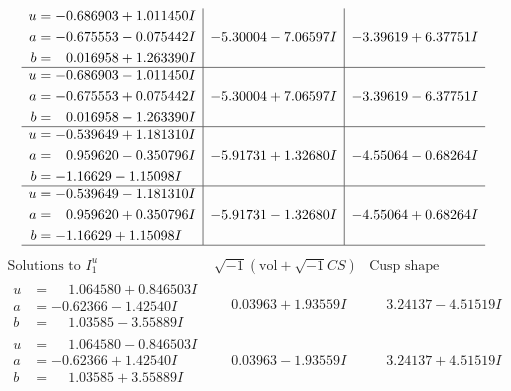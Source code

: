 \documentclass[1p]{elsarticle_modified}
\theoremstyle{definition}
\newcommand{\I}{\sqrt{-1}}
\begin{document}
$$\begin{array}{c|c|c}
\begin{aligned}
u &= -0.686903 + 1.011450 I \\
a &= -0.675553 - 0.075442 I \\
b &= \phantom{-}0.016958 + 1.263390 I\end{aligned}
 & -5.30004 - 7.06597 I & -3.39619 + 6.37751 I \\ \hline\begin{aligned}
u &= -0.686903 - 1.011450 I \\
a &= -0.675553 + 0.075442 I \\
b &= \phantom{-}0.016958 - 1.263390 I\end{aligned}
 & -5.30004 + 7.06597 I & -3.39619 - 6.37751 I \\ \hline\begin{aligned}
u &= -0.539649 + 1.181310 I \\
a &= \phantom{-}0.959620 - 0.350796 I \\
b &= -1.16629 - 1.15098 I\end{aligned}
 & -5.91731 + 1.32680 I & -4.55064 - 0.68264 I \\ \hline\begin{aligned}
u &= -0.539649 - 1.181310 I \\
a &= \phantom{-}0.959620 + 0.350796 I \\
b &= -1.16629 + 1.15098 I\end{aligned}
 & -5.91731 - 1.32680 I & -4.55064 + 0.68264 I\\
 \hline 
 \end{array}$$\newpage$$\begin{array}{c|c|c}  
\text{Solutions to }I^u_{1}& \I (\text{vol} + \sqrt{-1}CS) & \text{Cusp shape}\\
 \hline 
\begin{aligned}
u &= \phantom{-}1.064580 + 0.846503 I \\
a &= -0.62366 - 1.42540 I \\
b &= \phantom{-}1.03585 - 3.55889 I\end{aligned}
 & \phantom{-}0.03963 + 1.93559 I & \phantom{-}3.24137 - 4.51519 I \\ \hline\begin{aligned}
u &= \phantom{-}1.064580 - 0.846503 I \\
a &= -0.62366 + 1.42540 I \\
b &= \phantom{-}1.03585 + 3.55889 I\end{aligned}
 & \phantom{-}0.03963 - 1.93559 I & \phantom{-}3.24137 + 4.51519 I \\ \hline\begin{aligned}

\end{aligned}
\end{array}$$
\end{document}
